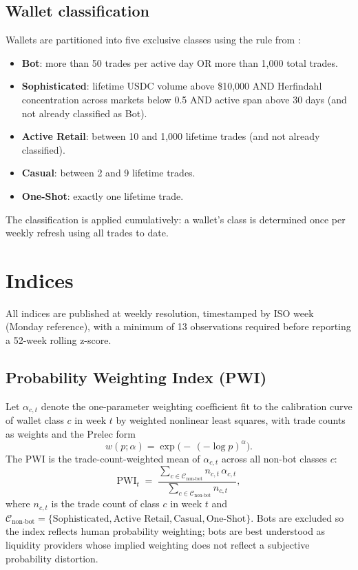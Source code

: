 \documentclass[11pt,letterpaper]{article}
\begin{document}
\subsection{Wallet classification}
Wallets are partitioned into five exclusive classes using the rule from \citet{dellavedova2026profits}:

\begin{itemize}
  \item \textbf{Bot}: more than 50 trades per active day OR more than 1{,}000 total trades.
  \item \textbf{Sophisticated}: lifetime USDC volume above \$10{,}000 AND Herfindahl concentration across markets below 0.5 AND active span above 30 days (and not already classified as Bot).
  \item \textbf{Active Retail}: between 10 and 1{,}000 lifetime trades (and not already classified).
  \item \textbf{Casual}: between 2 and 9 lifetime trades.
  \item \textbf{One-Shot}: exactly one lifetime trade.
\end{itemize}

The classification is applied cumulatively: a wallet's class is determined once per weekly refresh using all trades to date.

\section{Indices}
\label{sec:indices}

All indices are published at weekly resolution, timestamped by ISO week (Monday reference), with a minimum of 13 observations required before reporting a 52-week rolling z-score.

\subsection{Probability Weighting Index (PWI)}
\label{sub:pwi}

Let $\alpha_{c,t}$ denote the one-parameter \citet{prelec1998compound} weighting coefficient fit to the calibration curve of wallet class $c$ in week $t$ by weighted nonlinear least squares, with trade counts as weights and the Prelec form
\[
  w(p;\alpha) = \exp\!\big(-\,(-\log p)^{\alpha}\big).
\]
The PWI is the trade-count-weighted mean of $\alpha_{c,t}$ across all non-bot classes $c$:
\[
  \mathrm{PWI}_t \;=\; \frac{\sum_{c \in \mathcal{C}_{\mathrm{non\text{-}bot}}} n_{c,t}\,\alpha_{c,t}}
                           {\sum_{c \in \mathcal{C}_{\mathrm{non\text{-}bot}}} n_{c,t}},
\]
where $n_{c,t}$ is the trade count of class $c$ in week $t$ and $\mathcal{C}_{\mathrm{non\text{-}bot}} = \{\text{Sophisticated}, \text{Active Retail}, \text{Casual}, \text{One-Shot}\}$. Bots are excluded so the index reflects human probability weighting; bots are best understood as liquidity providers whose implied weighting does not reflect a subjective probability distortion.
\end{document}
